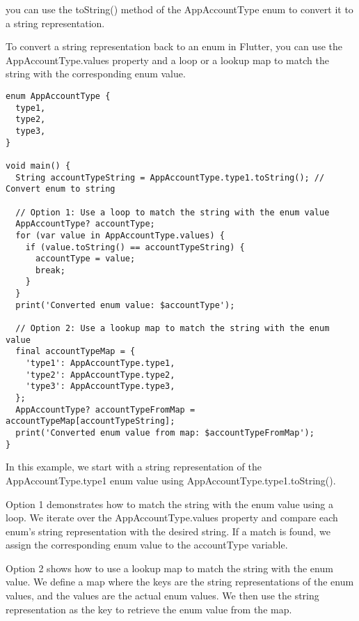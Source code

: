 you can use the toString() method of the AppAccountType enum to convert it to a string representation.

To convert a string representation back to an enum in Flutter, you can use the AppAccountType.values property and a 
loop or a lookup map to match the string with the corresponding enum value.

\begin{lstlisting}
enum AppAccountType {
  type1,
  type2,
  type3,
}

void main() {
  String accountTypeString = AppAccountType.type1.toString(); // Convert enum to string

  // Option 1: Use a loop to match the string with the enum value
  AppAccountType? accountType;
  for (var value in AppAccountType.values) {
    if (value.toString() == accountTypeString) {
      accountType = value;
      break;
    }
  }
  print('Converted enum value: $accountType');

  // Option 2: Use a lookup map to match the string with the enum value
  final accountTypeMap = {
    'type1': AppAccountType.type1,
    'type2': AppAccountType.type2,
    'type3': AppAccountType.type3,
  };
  AppAccountType? accountTypeFromMap = accountTypeMap[accountTypeString];
  print('Converted enum value from map: $accountTypeFromMap');
}
\end{lstlisting}

In this example, we start with a string representation of the AppAccountType.type1 enum value using 
AppAccountType.type1.toString().

Option 1 demonstrates how to match the string with the enum value using a loop. We iterate over the 
AppAccountType.values property and compare each enum's string representation with the desired string. 
If a match is found, we assign the corresponding enum value to the accountType variable.

Option 2 shows how to use a lookup map to match the string with the enum value. We define a map where the keys 
are the string representations of the enum values, and the values are the actual enum values. We then use the 
string representation as the key to retrieve the enum value from the map.

